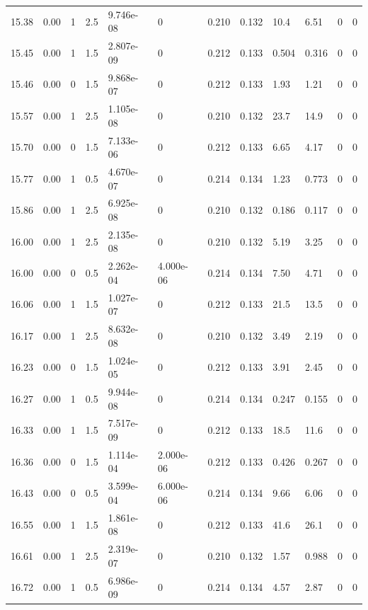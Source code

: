 \documentclass[preview]{standalone}
\begin{document}
{{{{{{\begin{tabular}{L{1.2cm}C{1.2cm} C{0.3cm}C{0.5cm} C{1.4cm}C{1.4cm} C{1.4cm}C{1.4cm} C{1.6cm}C{1.6cm} C{1.6cm}C{1.6cm}}
  15.38  &  0.00  & 1     & 2.5 &  9.746e-08  & 0  &  0.210&   0.132& 10.4 & 6.51   &  0 & 0  \\ 
  15.45  &  0.00  & 1     & 1.5 &  2.807e-09  & 0  &  0.212&   0.133& 0.504 & 0.316   &  0 & 0  \\ 
  15.46  &  0.00  & 0     & 1.5 &  9.868e-07  & 0  &  0.212&   0.133& 1.93 & 1.21   &  0 & 0  \\ 
  15.57  &  0.00  & 1     & 2.5 &  1.105e-08  & 0  &  0.210&   0.132& 23.7 & 14.9   &  0 & 0  \\ 
  15.70  &  0.00  & 0     & 1.5 &  7.133e-06  & 0  &  0.212&   0.133& 6.65 & 4.17   &  0 & 0  \\ 
  15.77  &  0.00  & 1     & 0.5 &  4.670e-07  & 0  &  0.214&   0.134& 1.23 & 0.773   &  0 & 0  \\ 
  15.86  &  0.00  & 1     & 2.5 &  6.925e-08  & 0  &  0.210&   0.132& 0.186 & 0.117   &  0 & 0  \\ 
  16.00  &  0.00  & 1     & 2.5 &  2.135e-08  & 0  &  0.210&   0.132& 5.19 & 3.25   &  0 & 0  \\ 
  16.00  &  0.00  & 0     & 0.5 &  2.262e-04  & 4.000e-06  &  0.214&   0.134& 7.50 & 4.71   &  0 & 0  \\ 
  16.06  &  0.00  & 1     & 1.5 &  1.027e-07  & 0  &  0.212&   0.133& 21.5 & 13.5   &  0 & 0  \\ 
  16.17  &  0.00  & 1     & 2.5 &  8.632e-08  & 0  &  0.210&   0.132& 3.49 & 2.19   &  0 & 0  \\ 
  16.23  &  0.00  & 0     & 1.5 &  1.024e-05  & 0  &  0.212&   0.133& 3.91 & 2.45   &  0 & 0  \\ 
  16.27  &  0.00  & 1     & 0.5 &  9.944e-08  & 0  &  0.214&   0.134& 0.247 & 0.155   &  0 & 0  \\ 
  16.33  &  0.00  & 1     & 1.5 &  7.517e-09  & 0  &  0.212&   0.133& 18.5 & 11.6   &  0 & 0  \\ 
  16.36  &  0.00  & 0     & 1.5 &  1.114e-04  & 2.000e-06  &  0.212&   0.133& 0.426 & 0.267   &  0 & 0  \\ 
  16.43  &  0.00  & 0     & 0.5 &  3.599e-04  & 6.000e-06  &  0.214&   0.134& 9.66 & 6.06   &  0 & 0  \\ 
  16.55  &  0.00  & 1     & 1.5 &  1.861e-08  & 0  &  0.212&   0.133& 41.6 & 26.1   &  0 & 0  \\ 
  16.61  &  0.00  & 1     & 2.5 &  2.319e-07  & 0  &  0.210&   0.132& 1.57 & 0.988   &  0 & 0  \\ 
  16.72  &  0.00  & 1     & 0.5 &  6.986e-09  & 0  &  0.214&   0.134& 4.57 & 2.87   &  0 & 0  \\ 

\end{tabular}}}}}}}
\end{document}
